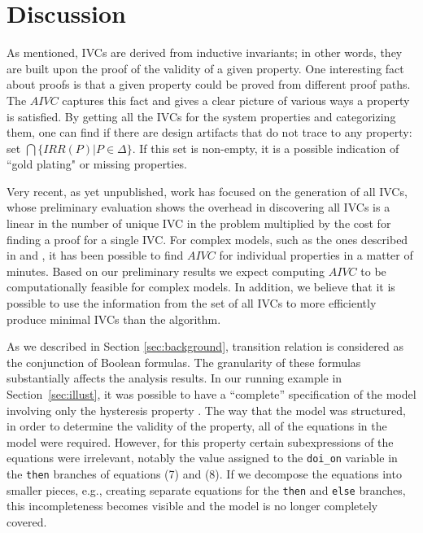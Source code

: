 \section{Discussion}
\label{sec:discussion}
As mentioned, IVCs are derived from inductive invariants; in other words, they are built upon the proof of the validity of a given property. One interesting fact about proofs
  is that a given property could be proved from different proof paths.
  The $AIVC$ captures this fact and gives a clear picture of various ways a property is satisfied. By getting all the IVCs for the system properties and categorizing them, one can find if there are design artifacts that do not trace to any property: set $\bigcap \{IRR (P) | P \in \Delta \}$.  If this set is non-empty, it is a possible indication of ``gold plating" or missing properties.

Very recent, as yet unpublished, work has focused on the
generation of all IVCs, whose preliminary evaluation
shows the overhead in discovering all IVCs is a linear in the
number of unique IVC in the problem multiplied by the cost
for finding a proof for a single IVC. For complex models, such
as the ones described in \cite {QFCS15:backes} and \cite{hilt2013}, it has been possible to
find $AIVC$ for individual properties in a matter of minutes.
Based on our preliminary results we expect computing $AIVC$ to be computationally feasible for complex models. In
addition, we believe that it is possible to use the information
from the set of all IVCs to more efficiently produce minimal
IVCs than the \ucbfalg algorithm.

As we described in Section \ref{sec:background}, transition relation is considered
as the conjunction of Boolean formulas. The granularity of these formulas substantially affects the analysis results.  In our running example in Section~\ref{sec:illust}, it was possible to have a ``complete'' specification of the model involving only the hysteresis property \hystp.  The way that the model was structured, in order to determine the validity of the property, all of the equations in the model were required.  However, for this property certain subexpressions of the equations were irrelevant, notably the value assigned to the \texttt{doi\_on} variable in the \texttt{then} branches of equations (7) and (8).  If we decompose the equations into smaller pieces, e.g., creating separate equations for the \texttt{then} and \texttt{else} branches, this incompleteness becomes visible and the model is no longer completely covered.

